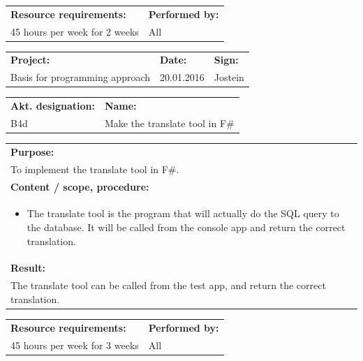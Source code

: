 \documentclass[12pt, a4paper]{article}
\begin{document}
\begin{tabularx}{\textwidth}{|X|p{30mm}|}
	\textbf{Resource requirements:}&\textbf{Performed by:}\\
	45 hours per week for 2 weeks&All\\
	\hline
\end{tabularx}

\newpage

\begin{tabularx}{\textwidth}{|X|p{32mm}|p{20mm}|}
	\hline
	\textbf{Project:}&\textbf{Date:}&\textbf{Sign:}\\
	Basis for programming approach&20.01.2016&Jostein\\
	\hline
\end{tabularx}

\begin{tabularx}{\textwidth}{|p{40mm}|X|}
	\textbf{Akt. designation:}&\textbf{Name:}\\
	B4d&Make the translate tool in F\# \\
	\hline
\end{tabularx}

\begin{tabularx}{\textwidth}{|X|}
	\textbf{Purpose:}\\
	To implement the translate tool in F\#.\\
	\hline
	\textbf{Content / scope, procedure:}\\
	\begin{itemize}
		\item The translate tool is the program that will actually do the SQL query to the database. It will be called from the console app and return the correct translation.
	\end{itemize}\\
 	\hline
	\textbf{Result:}\\
	The translate tool can be called from the test app, and return the correct translation. \\
	\hline
\end{tabularx}

\begin{tabularx}{\textwidth}{|X|p{30mm}|}
	\textbf{Resource requirements:}&\textbf{Performed by:}\\
	45 hours per week for 3 weeks&All\\
	\hline
\end{tabularx}

\newpage
\end{document}

